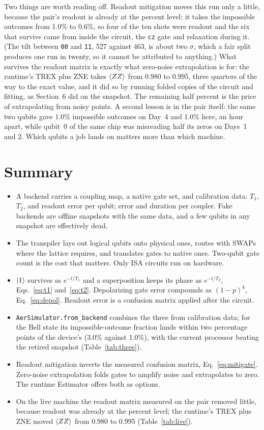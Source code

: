 \documentclass[11pt]{article}
\newcommand{\code}[1]{\texttt{#1}}
\begin{document}
Two things are worth reading off. Readout mitigation moves this run only a little, because the pair's readout is already at the percent level: it takes the impossible outcomes from 1.0\% to 0.6\%, so four of the ten shots were readout and the six that survive came from inside the circuit, the \code{cz} gate and relaxation during it. (The tilt between \code{00} and \code{11}, 527 against 463, is about two $\sigma$, which a fair split produces one run in twenty, so it cannot be attributed to anything.) What survives the readout matrix is exactly what zero-noise extrapolation is for: the runtime's TREX plus ZNE takes $\braket{ZZ}$ from $0.980$ to $0.995$, three quarters of the way to the exact value, and it did so by running folded copies of the circuit and fitting, as Section~6 did on the snapshot. The remaining half percent is the price of extrapolating from noisy points. A second lesson is in the pair itself: the same two qubits gave 1.0\% impossible outcomes on Day~4 and 1.0\% here, an hour apart, while qubit~0 of the same chip was misreading half its zeros on Days~1 and 2. Which qubits a job lands on matters more than which machine.

\section{Summary}

\begin{itemize}
\item A backend carries a coupling map, a native gate set, and calibration data: $T_1$, $T_2$, and readout error per qubit; error and duration per coupler. Fake backends are offline snapshots with the same data, and a few qubits in any snapshot are effectively dead.
\item The transpiler lays out logical qubits onto physical ones, routes with SWAPs where the lattice requires, and translates gates to native ones. Two-qubit gate count is the cost that matters. Only ISA circuits run on hardware.
\item $\ket{1}$ survives as $e^{-t/T_1}$ and a superposition keeps its phase as $e^{-t/T_2}$, Eqs.~\eqref{eq:t1} and~\eqref{eq:t2}. Depolarizing gate error compounds as $(1-p)^k$, Eq.~\eqref{eq:depol}. Readout error is a confusion matrix applied after the circuit.
\item \code{AerSimulator.from\_backend} combines the three from calibration data; for the Bell state its impossible-outcome fraction lands within two percentage points of the device's (3.0\% against 1.0\%), with the current processor beating the retired snapshot (Table~\ref{tab:three}).
\item Readout mitigation inverts the measured confusion matrix, Eq.~\eqref{eq:mitigate}. Zero-noise extrapolation folds gates to amplify noise and extrapolates to zero. The runtime Estimator offers both as options.
\item On the live machine the readout matrix measured on the pair removed little, because readout was already at the percent level; the runtime's TREX plus ZNE moved $\braket{ZZ}$ from $0.980$ to $0.995$ (Table~\ref{tab:live}).
\end{itemize}
\end{document}
